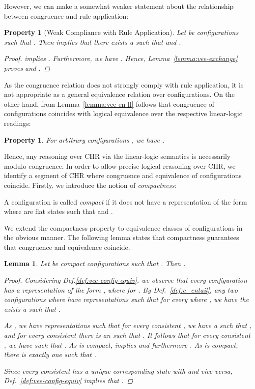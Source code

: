 \documentclass[acmtocl]{acmtrans2m}
\newtheorem{lemma}[theorem]{Lemma}
\newtheorem{property}[theorem]{Property}
\begin{document}
However, we can make a somewhat weaker statement about the relationship between
congruence and rule application:

\begin{property}[Weak Compliance with Rule Application] Let  be
configurations such that . Then  implies that
there exists a  such that  and .
\begin{proof}
 implies . Furthermore, we have . Hence, Lemma~\ref{lemma:vee-exchange} proves  and .
\end{proof}
\end{property}

As the congruence relation does not strongly comply with rule application, it is
not appropriate as a general equivalence relation over configurations. On the
other hand, from Lemma~\ref{lemma:vee-cn-ll} follows that congruence of
configurations coincides with logical equivalence over the respective
linear-logic readings:

\begin{property}
For arbitrary configurations , we have .
\end{property}

Hence, any reasoning over CHR via the linear-logic semantics is
necessarily modulo congruence. In order to allow precise logical reasoning over
CHR, we identify a segment of CHR where congruence and equivalence
of configurations coincide. Firstly, we introduce the notion of
\emph{compactness}:

\begin{definition}[Compactness]
 A configuration  is called \emph{compact} if it does not have a
 representation  of the form  where
  are flat states such that  and .
\end{definition}

We extend the compactness property to equivalence classes of configurations in
the obvious manner. The following lemma states that compactness guarantees that
congruence and equivalence coincide.

\begin{lemma}
 Let  be compact configurations such that . Then .
\begin{proof}
 Considering Def.\ref{def:vee-config-equiv}, we observe that every configuration
  has a representation of the form , where
  for . By
 Def.~\ref{def:c_entail}, any two configurations  where 
 have representations  such that for every  where , we have the exists
 a  such that .

 As , we have representations  such that for every consistent , we have a
  such that , and for every consistent  there is an 
 such that . It follows that for every consistent , we have
  such that . As  is compact, 
 implies  and furthermore . As  is compact,
 there is exactly one  such that .

 Since every consistent  has a unique corresponding state  with
  and vice versa, Def.~\ref{def:vee-config-equiv} implies that
 .
\end{proof}
\end{lemma}
\end{document}
